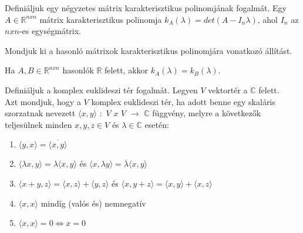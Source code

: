 \begin{frame}
  \begin{tcolorbox}[title={37}]
    Definiáljuk egy négyzetes mátrix karakterisztikus polinomjának fogalmát.
  \tcblower
Egy $A \in \mathbb{R}^{n x n}$ mátrix karakterisztikus polinomja $k_A({\lambda}) = det(A-I_n{\lambda})$, ahol $I_n$ az $n x n$-es egységmátrix.

  \end{tcolorbox}
\end{frame}


\begin{frame}
  \begin{tcolorbox}[title={38}]
    Mondjuk ki a hasonló mátrixok karakterisztikus polinomjára vonatkozó állítást.

  \tcblower
Ha $A,B \in \mathbb{R}^{n x n}$ hasonlók $\mathbb{R}$ felett, akkor $k_A({\lambda}) = k_B({\lambda})$.

  \end{tcolorbox}
\end{frame}


\begin{frame}
  \begin{tcolorbox}[title={39}]
   Definiáljuk a komplex euklideszi tér fogalmát.
  \tcblower
  Legyen $V$ vektortér a $\mathbb{C}$ felett.\\
 			Azt mondjuk, hogy a $V$ komplex euklideszi tér, ha adott benne egy skaláris szorzatnak nevezett ${\langle}x, y{\rangle}$ $:$ $V$ $x$ $V$ $\rightarrow$ $\mathbb{C}$ függvény, melyre a következők teljesülnek minden $x, y, z \in V$ és $\lambda \in \mathbb{C}$ esetén:

			\begin{enumerate}
			\item ${\langle}y, x{\rangle} = \overline{{\langle}x, y{\rangle}}$
			\item ${\langle}{\lambda}x, y{\rangle} = {\lambda}{\langle}x, y{\rangle}$ és ${\langle}x, {\lambda}y{\rangle} = \overline{{\lambda}}{\langle}x, y{\rangle}$
			\item ${\langle}x + y, z{\rangle} = {\langle}x, z{\rangle} + {\langle}y, z{\rangle}$ és ${\langle}x, y + z{\rangle} = {\langle}x, y{\rangle} + {\langle}x, z{\rangle}$
			\item ${\langle}x, x{\rangle}$ mindíg (valós és) nemnegatív
			\item ${\langle}x, x{\rangle} = 0  \iff  x = 0$
			\end{enumerate}
  \end{tcolorbox}
\end{frame}


